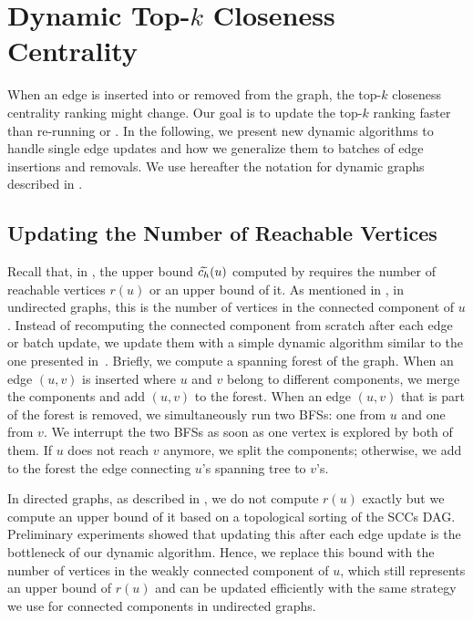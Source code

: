 

\section{Dynamic Top-$k$ Closeness Centrality}
%
When an edge is inserted into or removed from the graph, the top-$k$
closeness centrality ranking might change. Our goal is to update the top-$k$ ranking
faster than re-running \nbcut or \nbbound.
In the following, we present new dynamic algorithms to handle single edge updates
and how we generalize them to batches of edge insertions and removals.
We use hereafter the notation for dynamic graphs described in
.

\subsection{Updating the Number of Reachable Vertices}
\label{sec:dyn-topk-update-reachable}
%
Recall that, in , the upper bound $\widetilde{c_h}(u)$ computed by \bfscut
requires the number of reachable vertices $r(u)$ or an
upper bound of it.
As mentioned in , in undirected graphs, this is the number of vertices
in the connected component of $u$. Instead of recomputing the connected component
from scratch after each edge or batch update, we update them with a simple dynamic
algorithm similar to the one presented in~\cite{ediger2013computational}.
Briefly, we compute a spanning forest of the graph. When an edge $(u, v)$
is inserted where $u$ and $v$ belong to different components, we merge the
components and add $(u, v)$ to the forest.
When an edge $(u, v)$ that is part of the forest is removed, we simultaneously run
two BFSs: one from $u$ and one from $v$.
We interrupt the two BFSs as soon as one vertex is explored by both of them. If
$u$ does not reach $v$ anymore, we split the components; otherwise, we add to
the forest the edge connecting $u$'s spanning tree to $v$'s.

In directed graphs, as described in , we do not compute $r(u)$
exactly but we compute an upper bound of it based on a topological sorting
of the SCCs DAG. Preliminary experiments showed that updating this after each
edge update is the bottleneck of our dynamic algorithm. Hence, we replace
this bound with the number of vertices in the weakly connected component of $u$,
which still represents an upper bound of $r(u)$ and can be updated efficiently
with the same strategy we use for connected components in undirected graphs.


